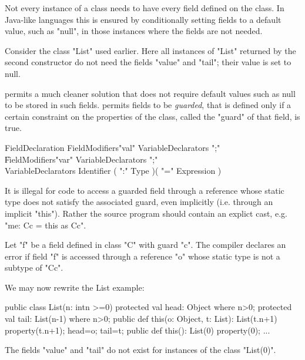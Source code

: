 Not every instance of a class needs to have every field defined on the
class. In Java-like languages this is ensured by conditionally setting
fields to a default value, such as \xcd"null", in those instances where the
fields are not needed.  

Consider the class \xcd"List" used earlier.  Here all instances of \xcd"List"
returned by the second constructor do not need the fields \xcd"value" and
\xcd"tail"; their value is set to null.

\Xten{} permits a much cleaner solution that does not require default
values such as null to be stored in such fields. \Xten{} permits fields to
be {\em guarded}, that is defined only if a certain constraint on the
properties of the class, called the \xcd"guard" of that field, is true.

\begin{grammar}
FieldDeclaration  \:
   FieldModifiers\opt \xcd"val" VariableDeclarators \xcd";" \\
   \|
   FieldModifiers\opt \xcd"var" VariableDeclarators \xcd";" \\
VariableDeclarators \:
   Identifier ( \xcd":" Type )\opt ( \xcd"=" Expression )\opt \\
\end{grammar}

It is illegal for code to access a guarded field through a reference
whose static type does not satisfy the associated guard, even
implicitly (i.e.{} through an implicit \xcd"this"). Rather the source
program should contain an explict cast, e.g.{} \xcd"me: C{c} = this as C{c}".

\begin{staticrule*}
Let \xcd"f" be a field defined in class
\xcd"C" with guard \xcd"c".  The compiler declares an error if
field \xcd"f" is accessed through a reference \xcd"o" whose static
type is not a subtype of \xcd"C{c}".
\end{staticrule*}

\begin{example}

We may now rewrite the List example:
\begin{xten}
public class List(n: int{n >=0}) {
  protected val head: Object where n>0;
  protected val tail: List(n-1) where n>0;
  public def this(o: Object, t: List): List(t.n+1) {
     property(t.n+1);
     head=o;
     tail=t;
  }
  public def this(): List(0) {
     property(0);
  }
  ...
}
\end{xten}

The fields \xcd"value" and \xcd"tail" do not exist for instances of the class
\xcd"List(0)".
\end{example}

